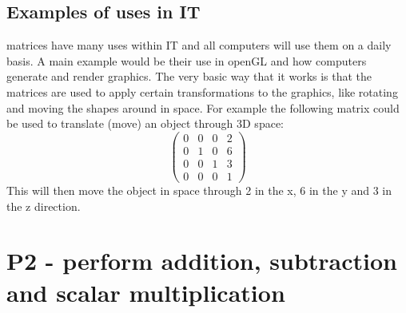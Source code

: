 \documentclass{article}
\begin{document}
\subsection{Examples of uses in IT}
matrices have many uses within IT and all computers will use them on a daily basis. A main example would be their use in openGL and how computers generate and render graphics. The very basic way that it works is that the matrices are used to apply certain transformations to the graphics, like rotating and moving the shapes around in space. For example the following matrix could be used to translate (move) an object through 3D space:
\[
	\begin{pmatrix}
		0 & 0 & 0 & 2\\
	    0 & 1 & 0 & 6\\
	    0 & 0 & 1 & 3\\
	    0 & 0 & 0 & 1
	\end{pmatrix}
\]
This will then move the object in space through 2 in the x, 6 in the y and 3 in the z direction.
\section{P2 - perform addition, subtraction and scalar multiplication}
\end{document}
